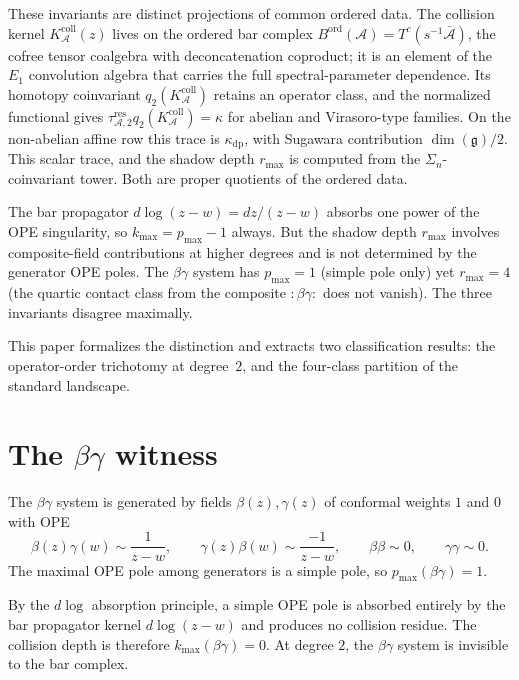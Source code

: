 \documentclass[11pt]{article}
\theoremstyle{definition}
\theoremstyle{remark}
\newcommand{\cA}{\mathcal{A}}
\newcommand{\fg}{\mathfrak{g}}
\numberwithin{equation}{section}
\begin{document}
These invariants are distinct projections of common ordered data. The
collision kernel $K_\cA^{\mathrm{coll}}(z)$ lives on the ordered bar complex
$B^{\mathrm{ord}}(\cA) = T^c(s^{-1}\bar{\cA})$, the cofree tensor
coalgebra with deconcatenation coproduct; it is an element of the
$E_1$ convolution algebra that carries the full spectral-parameter
dependence. Its homotopy coinvariant
$q_2(K_\cA^{\mathrm{coll}})$ retains an operator class, and the
normalized functional gives
$\tau_{\cA,2}^{\mathrm{res}}q_2(K_\cA^{\mathrm{coll}})=\kappa$ for
abelian and Virasoro-type families. On the non-abelian affine row this
trace is $\kappa_{\mathrm{dp}}$, with Sugawara contribution
$\dim(\fg)/2$. This scalar trace,
and the shadow depth $r_{\max}$ is computed from the
$\Sigma_n$-coinvariant tower. Both are proper quotients of the
ordered data.

The bar propagator
$d\log(z-w) = dz/(z-w)$ absorbs one power of the OPE singularity, so
$k_{\max} = p_{\max} - 1$ always. But the shadow depth $r_{\max}$
involves composite-field contributions at higher degrees and is not
determined by the generator OPE poles. The $\beta\gamma$ system has
$p_{\max} = 1$ (simple pole only) yet $r_{\max} = 4$ (the quartic
contact class from the composite $:\!\beta\gamma\!:$ does not vanish).
The three invariants disagree maximally.

This paper formalizes the distinction and extracts two classification
results: the operator-order trichotomy at degree~$2$, and the four-class
partition of the standard landscape.

\section{The \texorpdfstring{$\beta\gamma$}{beta-gamma} witness}
\label{sec:betagamma}

The $\beta\gamma$ system is generated by fields $\beta(z), \gamma(z)$
of conformal weights $1$ and $0$ with OPE
\begin{equation}\label{eq:bg-ope}
\beta(z)\gamma(w) \sim \frac{1}{z-w}, \qquad
\gamma(z)\beta(w) \sim \frac{-1}{z-w}, \qquad
\beta\beta \sim 0, \qquad
\gamma\gamma \sim 0.
\end{equation}
The maximal OPE pole among generators is a simple pole, so
$p_{\max}(\beta\gamma) = 1$.

By the $d\log$ absorption principle, a simple OPE pole is absorbed
entirely by the bar propagator kernel $d\log(z-w)$ and produces no
collision residue. The collision depth is therefore
$k_{\max}(\beta\gamma) = 0$. At degree $2$, the $\beta\gamma$ system
is invisible to the bar complex.
\end{document}
